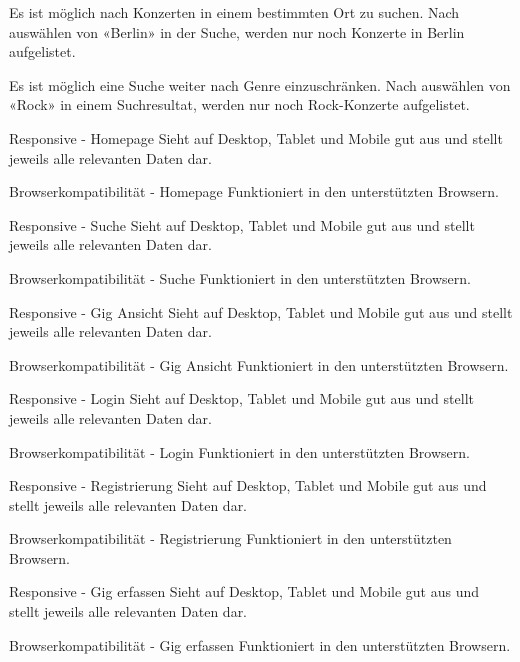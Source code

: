 \acceptancetest
  {Es ist möglich nach Konzerten in einem bestimmten Ort zu suchen.}
  {Nach auswählen von «Berlin» in der Suche, werden nur noch Konzerte in Berlin aufgelistet.}

\acceptancetest
  {Es ist möglich eine Suche weiter nach Genre einzuschränken.}
  {Nach auswählen von «Rock» in einem Suchresultat, werden nur noch Rock-Konzerte aufgelistet.}

\clearpage

\acceptancetest
  {Responsive - Homepage}
  {Sieht auf Desktop, Tablet und Mobile gut aus und stellt jeweils alle relevanten Daten dar.}

\acceptancetest
  {Browserkompatibilität - Homepage}
  {Funktioniert in den unterstützten Browsern.}

\clearpage

\acceptancetest
  {Responsive - Suche}
  {Sieht auf Desktop, Tablet und Mobile gut aus und stellt jeweils alle relevanten Daten dar.}

\acceptancetest
  {Browserkompatibilität - Suche}
  {Funktioniert in den unterstützten Browsern.}

\clearpage

\acceptancetest
  {Responsive - Gig Ansicht}
  {Sieht auf Desktop, Tablet und Mobile gut aus und stellt jeweils alle relevanten Daten dar.}

\acceptancetest
  {Browserkompatibilität - Gig Ansicht}
  {Funktioniert in den unterstützten Browsern.}

\clearpage

\acceptancetest
  {Responsive - Login}
  {Sieht auf Desktop, Tablet und Mobile gut aus und stellt jeweils alle relevanten Daten dar.}

\acceptancetest
  {Browserkompatibilität - Login}
  {Funktioniert in den unterstützten Browsern.}

\clearpage

\acceptancetest
  {Responsive - Registrierung}
  {Sieht auf Desktop, Tablet und Mobile gut aus und stellt jeweils alle relevanten Daten dar.}

\acceptancetest
  {Browserkompatibilität - Registrierung}
  {Funktioniert in den unterstützten Browsern.}

\clearpage

\acceptancetest
  {Responsive - Gig erfassen}
  {Sieht auf Desktop, Tablet und Mobile gut aus und stellt jeweils alle relevanten Daten dar.}

\acceptancetest
  {Browserkompatibilität - Gig erfassen}
  {Funktioniert in den unterstützten Browsern.}

